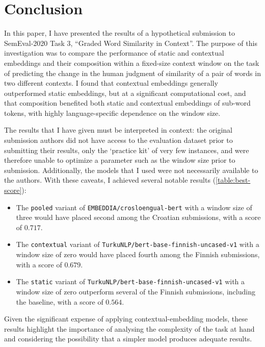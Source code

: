 \section{Conclusion}
\label{sec:conclusion}

In this paper, I have presented the results of a hypothetical submission to
SemEval-2020 Task 3, ``Graded Word Similarity in Context''.
The purpose of this investigation was to compare the performance of static and
contextual embeddings and their composition within a fixed-size context window on the
task of predicting the change in the human judgment of similarity of a pair of words in
two different contexts.
I found that contextual embeddings generally outperformed static embeddings, but at a
significant computational cost, and that composition benefited both static and
contextual embeddings of sub-word tokens, with highly language-specific dependence on
the window size.

The results that I have given must be interpreted in context: the original submission
authors did not have access to the evaluation dataset prior to submitting their
results, only the `practice kit' of very few instances, and were therefore unable to
optimize a parameter such as the window size prior to submission.
Additionally, the models that I used were not necessarily available to the authors.
With these caveats, I achieved several notable results (\cref{table:best-score}):
\begin{itemize}
  \item The \texttt{pooled} variant of \texttt{EMBEDDIA/crosloengual-bert} with a window
        size of three would have placed second among the Croatian submissions, with a
        score of $0.717$.
  \item The \texttt{contextual} variant of \texttt{TurkuNLP/bert-base-finnish-uncased-v1}
        with a window size of zero would have placed fourth among the Finnish
        submissions, with a score of $0.679$.
  \item The \texttt{static} variant of \texttt{TurkuNLP/bert-base-finnish-uncased-v1}
        with a window size of zero outperform several of the Finnish submissions,
        including the baseline, with a score of $0.564$.
\end{itemize}
Given the significant expense of applying contextual-embedding models, these results
highlight the importance of analysing the complexity of the task at hand and
considering the possibility that a simpler model produces adequate results.
